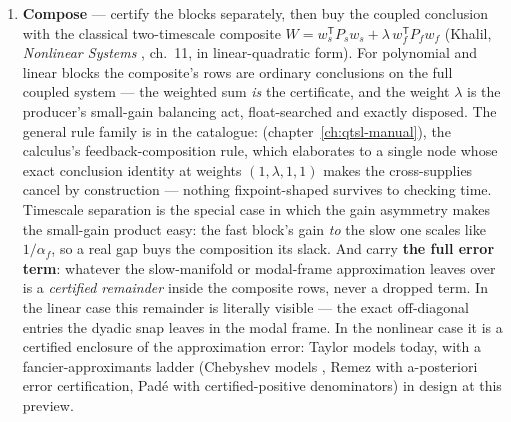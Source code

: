 \begin{enumerate}
  (proposed, not shipped): certified spectral windows and an inertia
  rule --- eigenvalue \emph{counting} across shifts, the one
  conclusion shape the shipped roster does not span. When those ship,
  ``the spectrum splits into
  $(-\infty, -1/\varepsilon] \cup [-c, 0)$'' becomes a specific
  certified sentence.
\item \textbf{Compose} --- certify the blocks separately, then buy the
  coupled conclusion with the classical two-timescale composite
  $W = w_s^{\mathsf T} P_s w_s + \lambda\, w_f^{\mathsf T} P_f w_f$
  (Khalil, \emph{Nonlinear Systems} \cite{khalil2002nonlinear},
  ch.~11, in linear-quadratic form). For polynomial and linear blocks the composite's rows are
  ordinary conclusions on the full coupled system --- the weighted sum
  \emph{is} the certificate, and the weight $\lambda$ is the
  producer's small-gain balancing act, float-searched and exactly
  disposed. The general rule family is in the catalogue:
   (chapter~\ref{ch:qtsl-manual}), the calculus's
  feedback-composition rule, which elaborates to a single
   node whose exact conclusion identity at weights
  $(1, \lambda, 1, 1)$ makes the cross-supplies cancel by construction
  --- nothing fixpoint-shaped survives to checking time. Timescale
  separation is the special case in which the gain asymmetry makes the
  small-gain product easy: the fast block's gain \emph{to} the slow
  one scales like $1/\alpha_f$, so a real gap buys the composition its
  slack. And carry \textbf{the full error term}: whatever the
  slow-manifold or modal-frame approximation leaves over is a
  \emph{certified remainder} inside the composite rows, never a
  dropped term. In the linear case this remainder is literally visible
  --- the exact off-diagonal entries the dyadic snap leaves in the
  modal frame. In the nonlinear case it is a certified enclosure of
  the approximation error: Taylor models today, with a
  fancier-approximants ladder (Chebyshev models
  \cite{ensl-00472509v2}, Remez with a-posteriori error
  certification, Pad\'e with certified-positive denominators) in
  design at this preview.
\end{enumerate}

